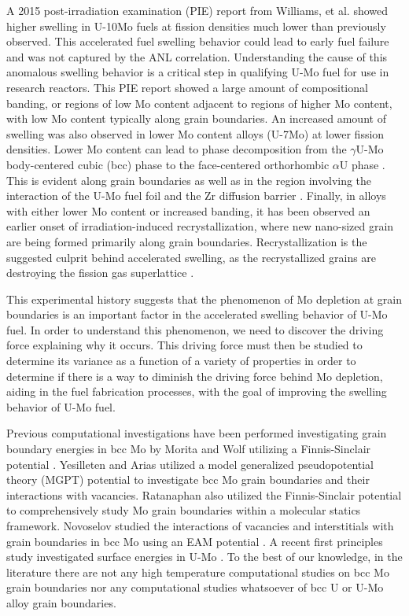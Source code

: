 \documentclass[review]{elsarticle}
\begin{document}
A 2015 post-irradiation examination (PIE) report \cite{afip6report} from Williams, et al. showed higher swelling in U-10Mo fuels at fission densities much lower than previously observed. This accelerated fuel swelling behavior could lead to early fuel failure and was not captured by the ANL correlation. Understanding the cause of this anomalous swelling behavior is a critical step in qualifying U-Mo fuel for use in research reactors. This PIE report showed a large amount of compositional banding, or regions of low Mo content adjacent to regions of higher Mo content, with low Mo content typically along grain boundaries. An increased amount of swelling was also observed in lower Mo content alloys (U-7Mo) \cite{vandenberghe2014} at lower fission densities. Lower Mo content can lead to phase decomposition from the $\gamma$U-Mo body-centered cubic (bcc) phase to the face-centered orthorhombic $\alpha$U phase \cite{janfong2014}. This is evident along grain boundaries as well as in the region involving the interaction of the U-Mo fuel foil and the Zr diffusion barrier \cite{park2015}. Finally, in alloys with either lower Mo content or increased banding, it has been observed an earlier onset of irradiation-induced recrystallization\cite{kim2013A}, where new nano-sized grain are being formed primarily along grain boundaries. Recrystallization is the suggested culprit behind accelerated swelling, as the recrystallized grains are destroying the fission gas superlattice \cite{vandenberghe2008}. 

This experimental history suggests that the phenomenon of Mo depletion at grain boundaries is an important factor in the accelerated swelling behavior of U-Mo fuel. In order to understand this phenomenon, we need to discover the driving force explaining why it occurs. This driving force must then be studied to determine its variance as a function of a variety of properties in order to determine if there is a way to diminish the driving force behind Mo depletion, aiding in the fuel fabrication processes, with the goal of improving the swelling behavior of U-Mo fuel.

Previous computational investigations have been performed investigating grain boundary energies in bcc Mo by Morita \cite{morita1997} and Wolf \cite{wolf1989bcc1, wolf1990bcc2} utilizing a Finnis-Sinclair potential \cite{finnis}. Yesilleten and Arias \cite{yesilleten2001} utilized a model generalized pseudopotential theory (MGPT) \cite{moriarty1988} potential to investigate bcc Mo grain boundaries and their interactions with vacancies. Ratanaphan \cite{ratanaphan2015} also utilized the Finnis-Sinclair potential \cite{finnis} to comprehensively study Mo grain boundaries within a molecular statics framework. Novoselov \cite{novoselov2014} studied the interactions of vacancies and interstitials with grain boundaries in bcc Mo using an EAM \cite{daw1984, daw1993} potential \cite{starikov2011}. A recent first principles study investigated surface energies in U-Mo \cite{zhigang2018}. To the best of our knowledge, in the literature there are not any high temperature computational studies on bcc Mo grain boundaries nor any computational studies whatsoever of bcc U or U-Mo alloy grain boundaries.
\end{document}
